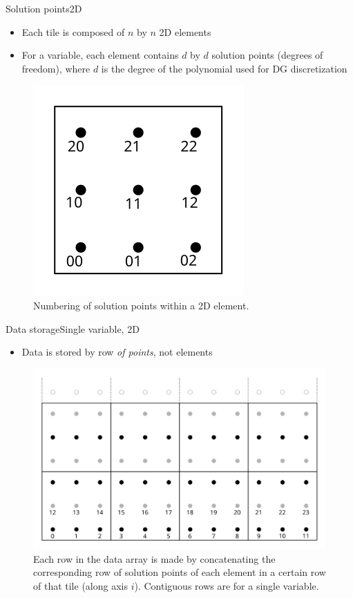 \documentclass{beamer}
\begin{document}
\begin{frame}{Solution points}{2D}
\begin{itemize}
    \item Each tile is composed of $n$ by $n$ 2D elements
    \item For a variable, each element contains $d$ by $d$ solution points (degrees of freedom),
        where $d$ is the degree of the polynomial used for DG discretization
\end{itemize}
\begin{figure}
    \includegraphics[scale=1.0]{img/elem_numbering}
    \caption{Numbering of solution points within a 2D element.}
\end{figure}
\end{frame}

\begin{frame}{Data storage}{Single variable, 2D}
\begin{itemize}
    \item Data is stored by row \emph{of points}, not elements
\end{itemize}
\begin{figure}
    \includegraphics[scale=0.7]{img/variable_storage}
    \caption{Each row in the data array is made by concatenating the corresponding row of solution points of
             each element in a certain row of that tile (along axis $i$). Contiguous rows are for a single variable.}
\end{figure}
\end{frame}
\end{document}
